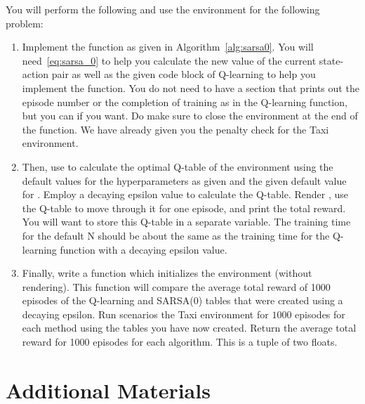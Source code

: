 \begin{problem}
\label{prob:sarsa}
    You will perform the following and use the  environment for the following problem:
    \begin{enumerate}
        \item Implement the  function as given in Algorithm\ \ref{alg:sarsa0}.
        You will need\ \ref{eq:sarsa_0} to help you calculate the new value of the current state-action pair as well as the given code block of Q-learning to help you implement the function.
        You do not need to have a section that prints out the episode number or the completion of training as in the Q-learning function, but you can if you want.
        Do make sure to close the environment at the end of the function.
        We have already given you the penalty check for the Taxi environment.

        \item Then, use  to calculate the optimal Q-table of the environment using the default values for the hyperparameters as given and the given default value for .
        Employ a decaying epsilon value to calculate the Q-table.
        Render , use the Q-table to move through it for one episode, and print the total reward.
        You will want to store this Q-table in a separate variable.
        The training time for the default N should be about the same as the training time for the Q-learning function with a decaying epsilon value.

        \item Finally, write a function  which initializes the  environment (without rendering).
        This function will compare the average total reward of 1000 episodes of the Q-learning and SARSA(0) tables that were created using a decaying epsilon.
        Run scenarios the Taxi environment for $1000$ episodes for each method using the tables you have now created.
        Return the average total reward for 1000 episodes for each algorithm.
        This is a tuple of two floats.
    \end{enumerate}

\end{problem}

\section*{Additional Materials}
